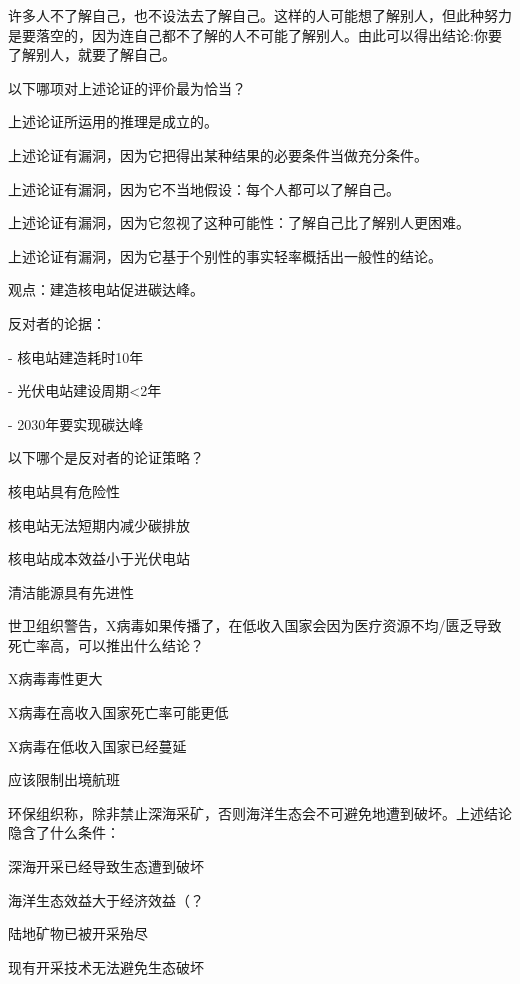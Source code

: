 \documentclass{exam-zh}
\begin{document}
\begin{question}
许多人不了解自己，也不设法去了解自己。这样的人可能想了解别人，但此种努力是要落空的，因为连自己都不了解的人不可能了解别人。由此可以得出结论:你要了解别人，就要了解自己。

以下哪项对上述论证的评价最为恰当？ \paren[]
\begin{choices}
  \item 上述论证所运用的推理是成立的。
  \item 上述论证有漏洞，因为它把得出某种结果的必要条件当做充分条件。
  \item 上述论证有漏洞，因为它不当地假设：每个人都可以了解自己。
  \item 上述论证有漏洞，因为它忽视了这种可能性：了解自己比了解别人更困难。
  \item 上述论证有漏洞，因为它基于个别性的事实轻率概括出一般性的结论。
\end{choices}
\end{question}

\begin{question}
观点：建造核电站促进碳达峰。

反对者的论据：

- 核电站建造耗时10年

- 光伏电站建设周期<2年

- 2030年要实现碳达峰

以下哪个是反对者的论证策略？ \paren[]
\begin{choices}
  \item 核电站具有危险性
  \item 核电站无法短期内减少碳排放
  \item 核电站成本效益小于光伏电站
  \item 清洁能源具有先进性
\end{choices}
\end{question}

\begin{question}
世卫组织警告，X病毒如果传播了，在低收入国家会因为医疗资源不均/匮乏导致死亡率高，可以推出什么结论？ \paren[]
\begin{choices}
  \item X病毒毒性更大
  \item X病毒在高收入国家死亡率可能更低
  \item X病毒在低收入国家已经蔓延
  \item 应该限制出境航班
\end{choices}
\end{question}

\begin{question}
环保组织称，除非禁止深海采矿，否则海洋生态会不可避免地遭到破坏。上述结论隐含了什么条件： \paren[]
\begin{choices}
  \item 深海开采已经导致生态遭到破坏
  \item 海洋生态效益大于经济效益（？
  \item 陆地矿物已被开采殆尽
  \item 现有开采技术无法避免生态破坏
\end{choices}
\end{question}
\end{document}
